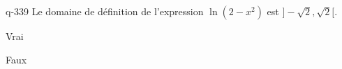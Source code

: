 \begin{truefalse}{q-339}
Le domaine de définition de l'expression $\ln(2-x^2)$ est $]-\sqrt{2},\sqrt{2}[$.
\item* Vrai
\item Faux
\end{truefalse}

